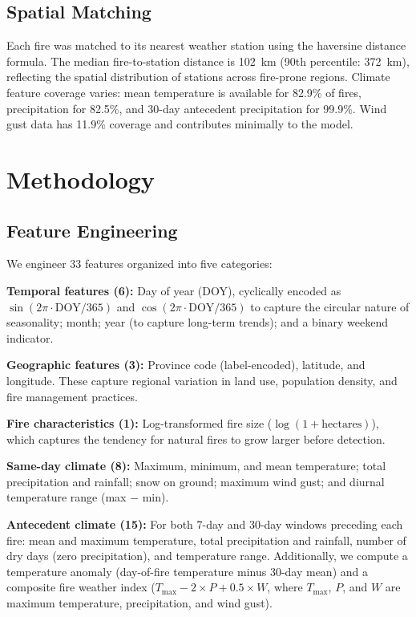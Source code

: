 \documentclass[sigconf,nonacm]{acmart}
\begin{document}
\subsection{Spatial Matching}

Each fire was matched to its nearest weather station using the haversine distance formula. The median fire-to-station distance is 102~km (90th percentile: 372~km), reflecting the spatial distribution of stations across fire-prone regions. Climate feature coverage varies: mean temperature is available for 82.9\% of fires, precipitation for 82.5\%, and 30-day antecedent precipitation for 99.9\%. Wind gust data has 11.9\% coverage and contributes minimally to the model.

\section{Methodology}

\subsection{Feature Engineering}

We engineer 33 features organized into five categories:

\textbf{Temporal features (6):} Day of year (DOY), cyclically encoded as $\sin(2\pi \cdot \text{DOY}/365)$ and $\cos(2\pi \cdot \text{DOY}/365)$ to capture the circular nature of seasonality; month; year (to capture long-term trends); and a binary weekend indicator.

\textbf{Geographic features (3):} Province code (label-encoded), latitude, and longitude. These capture regional variation in land use, population density, and fire management practices.

\textbf{Fire characteristics (1):} Log-transformed fire size ($\log(1 + \text{hectares})$), which captures the tendency for natural fires to grow larger before detection.

\textbf{Same-day climate (8):} Maximum, minimum, and mean temperature; total precipitation and rainfall; snow on ground; maximum wind gust; and diurnal temperature range (max $-$ min).

\textbf{Antecedent climate (15):} For both 7-day and 30-day windows preceding each fire: mean and maximum temperature, total precipitation and rainfall, number of dry days (zero precipitation), and temperature range. Additionally, we compute a temperature anomaly (day-of-fire temperature minus 30-day mean) and a composite fire weather index ($T_\text{max} - 2 \times P + 0.5 \times W$, where $T_\text{max}$, $P$, and $W$ are maximum temperature, precipitation, and wind gust).
\end{document}
